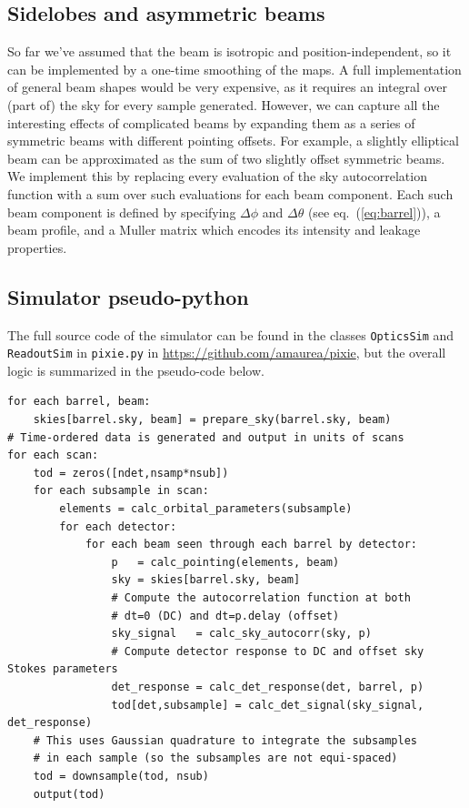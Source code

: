 \documentclass{article}
\begin{document}
\subsection{Sidelobes and asymmetric beams}
So far we've assumed that the beam is isotropic and position-independent,
so it can be implemented by a one-time smoothing of the maps. A full
implementation of general beam shapes would be very expensive, as it
requires an integral over (part of) the sky for every sample generated.
However, we can capture all the interesting effects of complicated beams
by expanding them as a series of symmetric beams with different pointing
offsets. For example, a slightly elliptical beam can be approximated as
the sum of two slightly offset symmetric beams.
We implement this by replacing every evaluation of the sky autocorrelation
function with a sum over such evaluations for each beam component.
Each such beam component is defined by specifying
$\Delta\phi$ and $\Delta\theta$ (see eq.~(\ref{eq:barrel})),
a beam profile, and a Muller matrix which encodes its
intensity and leakage properties.

\subsection{Simulator pseudo-python}
The full source code of the simulator can be found in the
classes \texttt{OpticsSim} and \texttt{ReadoutSim} in
\texttt{pixie.py} in \url{https://github.com/amaurea/pixie}, but the
overall logic is summarized in the pseudo-code below.
\begin{lstlisting}
for each barrel, beam:
	skies[barrel.sky, beam] = prepare_sky(barrel.sky, beam)
# Time-ordered data is generated and output in units of scans
for each scan:
	tod = zeros([ndet,nsamp*nsub])
	for each subsample in scan:
		elements = calc_orbital_parameters(subsample)
		for each detector:
			for each beam seen through each barrel by detector:
				p   = calc_pointing(elements, beam)
				sky = skies[barrel.sky, beam]
				# Compute the autocorrelation function at both
				# dt=0 (DC) and dt=p.delay (offset)
				sky_signal   = calc_sky_autocorr(sky, p)
				# Compute detector response to DC and offset sky Stokes parameters
				det_response = calc_det_response(det, barrel, p)
				tod[det,subsample] = calc_det_signal(sky_signal, det_response)
	# This uses Gaussian quadrature to integrate the subsamples
	# in each sample (so the subsamples are not equi-spaced)
	tod = downsample(tod, nsub)
	output(tod)
\end{lstlisting}
\end{document}
